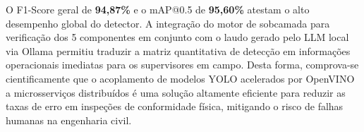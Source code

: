 O F1-Score geral de \textbf{94,87\%} e o mAP@0.5 de \textbf{95,60\%} atestam o alto desempenho global do detector. A integração do motor de sobcamada para verificação dos 5 componentes em conjunto com o laudo gerado pelo LLM local via Ollama permitiu traduzir a matriz quantitativa de detecção em informações operacionais imediatas para os supervisores em campo. Desta forma, comprova-se cientificamente que o acoplamento de modelos YOLO acelerados por OpenVINO a microsserviços distribuídos é uma solução altamente eficiente para reduzir as taxas de erro em inspeções de conformidade física, mitigando o risco de falhas humanas na engenharia civil.
